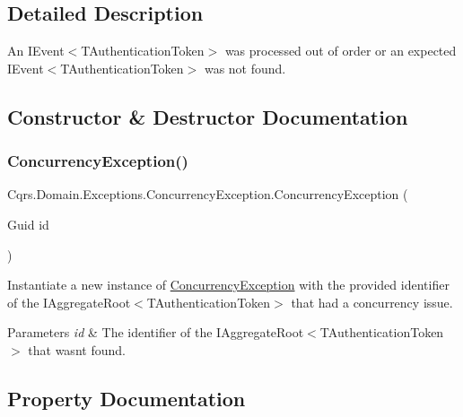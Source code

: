 \subsection{Detailed Description}
An I\+Event$<$\+T\+Authentication\+Token$>$ was processed out of order or an expected I\+Event$<$\+T\+Authentication\+Token$>$ was not found. 



\subsection{Constructor \& Destructor Documentation}
\mbox{\label{classCqrs_1_1Domain_1_1Exceptions_1_1ConcurrencyException_aed52d2484adb911db51fd50f18f3e477_aed52d2484adb911db51fd50f18f3e477}} 
\subsubsection{\texorpdfstring{Concurrency\+Exception()}{ConcurrencyException()}}
{\footnotesize\ttfamily Cqrs.\+Domain.\+Exceptions.\+Concurrency\+Exception.\+Concurrency\+Exception (\begin{DoxyParamCaption}\item[{Guid}]{id }\end{DoxyParamCaption})}



Instantiate a new instance of \hyperlink{classCqrs_1_1Domain_1_1Exceptions_1_1ConcurrencyException}{Concurrency\+Exception} with the provided identifier of the I\+Aggregate\+Root$<$\+T\+Authentication\+Token$>$ that had a concurrency issue. 


\begin{DoxyParams}{Parameters}
{\em id} & The identifier of the I\+Aggregate\+Root$<$\+T\+Authentication\+Token$>$ that wasn\textquotesingle{}t found.\\
\hline
\end{DoxyParams}


\subsection{Property Documentation}
\mbox{\label{classCqrs_1_1Domain_1_1Exceptions_1_1ConcurrencyException_a7b8143f3a8047307373503c31e8b3366_a7b8143f3a8047307373503c31e8b3366}} 
